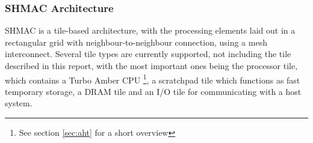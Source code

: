 \subsubsection{SHMAC Architecture}

SHMAC is a tile-based architecture, with the processing elements laid out in a rectangular grid with neighbour-to-neighbour connection, using a mesh interconnect.
Several tile types are currently supported, not including the tile described in this report,
with the most important ones being the processor tile, which contains a Turbo Amber CPU
\footnote{See section \ref{sec:aht} for a short overview}, a scratchpad tile which functions as
fast temporary storage, a DRAM tile and an I/O tile for communicating with a host system.

%  
%  
%  
%  
